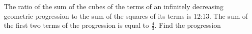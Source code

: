 
%
%
%
%
% 
% 

\question[3] The ratio of the sum of the cubes of the terms of an infinitely decreasing 
geometric progression to the sum of the squares of its terms is 12:13. The sum of the 
first two terms of the progression is equal to $\frac{4}{3}$. Find the progression


\ifprintanswers
\fi 

